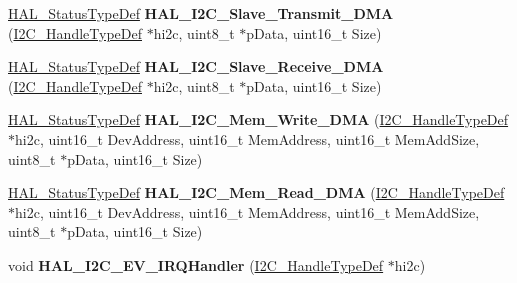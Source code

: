\begin{DoxyCompactItemize}
\mbox{\hyperlink{stm32f4xx__hal__def_8h_a63c0679d1cb8b8c684fbb0632743478f}{H\+A\+L\+\_\+\+Status\+Type\+Def}} {\bfseries H\+A\+L\+\_\+\+I2\+C\+\_\+\+Slave\+\_\+\+Transmit\+\_\+\+D\+MA} (\mbox{\hyperlink{struct_i2_c___handle_type_def}{I2\+C\+\_\+\+Handle\+Type\+Def}} $\ast$hi2c, uint8\+\_\+t $\ast$p\+Data, uint16\+\_\+t Size)
\item 
\mbox{\label{group___i2_c___exported___functions___group2_gad9dd42a10e5c108e30e6546cb64639c2}} 
\mbox{\hyperlink{stm32f4xx__hal__def_8h_a63c0679d1cb8b8c684fbb0632743478f}{H\+A\+L\+\_\+\+Status\+Type\+Def}} {\bfseries H\+A\+L\+\_\+\+I2\+C\+\_\+\+Slave\+\_\+\+Receive\+\_\+\+D\+MA} (\mbox{\hyperlink{struct_i2_c___handle_type_def}{I2\+C\+\_\+\+Handle\+Type\+Def}} $\ast$hi2c, uint8\+\_\+t $\ast$p\+Data, uint16\+\_\+t Size)
\item 
\mbox{\label{group___i2_c___exported___functions___group2_ga12a2a86be393359534f630cdd090d8bb}} 
\mbox{\hyperlink{stm32f4xx__hal__def_8h_a63c0679d1cb8b8c684fbb0632743478f}{H\+A\+L\+\_\+\+Status\+Type\+Def}} {\bfseries H\+A\+L\+\_\+\+I2\+C\+\_\+\+Mem\+\_\+\+Write\+\_\+\+D\+MA} (\mbox{\hyperlink{struct_i2_c___handle_type_def}{I2\+C\+\_\+\+Handle\+Type\+Def}} $\ast$hi2c, uint16\+\_\+t Dev\+Address, uint16\+\_\+t Mem\+Address, uint16\+\_\+t Mem\+Add\+Size, uint8\+\_\+t $\ast$p\+Data, uint16\+\_\+t Size)
\item 
\mbox{\label{group___i2_c___exported___functions___group2_gab25b99552182d2486d8eb441fffdd0a4}} 
\mbox{\hyperlink{stm32f4xx__hal__def_8h_a63c0679d1cb8b8c684fbb0632743478f}{H\+A\+L\+\_\+\+Status\+Type\+Def}} {\bfseries H\+A\+L\+\_\+\+I2\+C\+\_\+\+Mem\+\_\+\+Read\+\_\+\+D\+MA} (\mbox{\hyperlink{struct_i2_c___handle_type_def}{I2\+C\+\_\+\+Handle\+Type\+Def}} $\ast$hi2c, uint16\+\_\+t Dev\+Address, uint16\+\_\+t Mem\+Address, uint16\+\_\+t Mem\+Add\+Size, uint8\+\_\+t $\ast$p\+Data, uint16\+\_\+t Size)
\item 
\mbox{\label{group___i2_c___exported___functions___group2_ga0cd3cc56c83b85a65e31c945c854d9d5}} 
void {\bfseries H\+A\+L\+\_\+\+I2\+C\+\_\+\+E\+V\+\_\+\+I\+R\+Q\+Handler} (\mbox{\hyperlink{struct_i2_c___handle_type_def}{I2\+C\+\_\+\+Handle\+Type\+Def}} $\ast$hi2c)
\item 

\end{DoxyCompactItemize}
